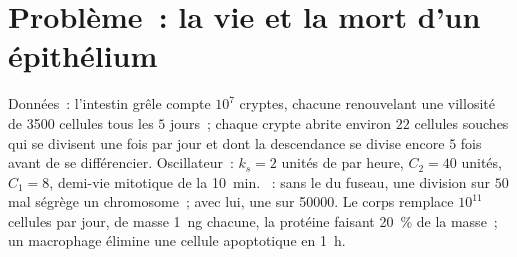 \section{Problème~: la vie et la mort d'un épithélium}

\begin{problem}
\label{pb:b3:cell-cycle-apoptosis:1}
Données~: l'intestin grêle compte $10^{7}$ cryptes, chacune renouvelant
une villosité de \num{3500} cellules tous les $5$ jours~; chaque crypte
abrite environ $22$ cellules souches qui se divisent une fois par jour
et dont la descendance se divise encore $5$ fois avant de se
différencier. Oscillateur~: $k_{s} = 2$ unités de  par heure,
$C_{2} = 40$ unités, $C_{1} = 8$, demi-vie mitotique de la 
\qty{10}{min}. ~: sans le  du fuseau,
une division sur $50$ mal ségrège un chromosome~; avec lui, une sur
\num{50000}. Le corps remplace $10^{11}$ cellules par jour, de masse
\qty{1}{ng} chacune, la protéine faisant \qty{20}{\%} de la masse~; un
macrophage élimine une cellule apoptotique en \qty{1}{h}.


\end{problem}
